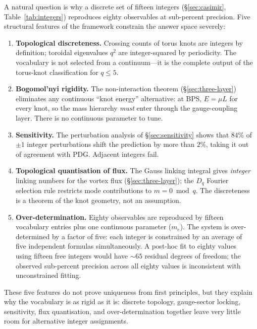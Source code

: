 \documentclass[11pt]{article}
\begin{document}
A natural question is why a discrete set of fifteen integers
(\S\ref{sec:casimir}, Table~\ref{tab:integers}) reproduces eighty
observables at sub-percent precision.  Five structural features of
the framework constrain the answer space severely:
\begin{enumerate}
\item \textbf{Topological discreteness.}  Crossing counts of
      torus knots are integers by definition; toroidal eigenvalues
      $q^2$ are integer-squared by periodicity.  The vocabulary is
      not selected from a continuum---it is the complete output of
      the torus-knot classification for $q \leq 5$.
\item \textbf{Bogomol'nyi rigidity.}  The non-interaction theorem
      (\S\ref{sec:three-layer}) eliminates any continuous ``knot
      energy'' alternative: at BPS, $E = \mu L$ for every knot, so
      the mass hierarchy \emph{must} enter through the gauge-coupling
      layer.  There is no continuous parameter to tune.
\item \textbf{Sensitivity.}  The perturbation analysis of
      \S\ref{sec:sensitivity} shows that $84\%$ of $\pm 1$ integer
      perturbations shift the prediction by more than $2\%$, taking
      it out of agreement with PDG.  Adjacent integers fail.
\item \textbf{Topological quantisation of flux.}  The Gauss linking
      integral gives \emph{integer} linking numbers for the vortex
      flux (\S\ref{sec:three-layer}); the $D_q$ Fourier selection
      rule restricts mode contributions to $m = 0 \bmod q$.  The
      discreteness is a theorem of the knot geometry, not an
      assumption.
\item \textbf{Over-determination.}  Eighty observables are
      reproduced by fifteen vocabulary entries plus one continuous
      parameter ($m_e$).  The system is over-determined by a factor
      of five: each integer is constrained by an average of five
      independent formulas simultaneously.  A post-hoc fit to eighty
      values using fifteen free integers would have $\sim 65$
      residual degrees of freedom; the observed sub-percent precision
      across all eighty values is inconsistent with unconstrained
      fitting.
\end{enumerate}
These five features do not prove uniqueness from first principles,
but they explain why the vocabulary is as rigid as it is: discrete
topology, gauge-sector locking, sensitivity, flux quantisation, and
over-determination together leave very little room for alternative
integer assignments.
\end{document}
